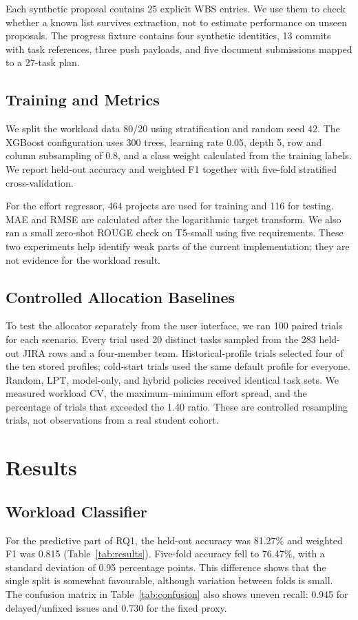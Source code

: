 \documentclass[conference]{IEEEtran}
\begin{document}
Each synthetic proposal contains 25 explicit WBS entries. We use them to check whether a known list survives extraction, not to estimate performance on unseen proposals. The progress fixture contains four synthetic identities, 13 commits with task references, three push payloads, and five document submissions mapped to a 27-task plan.

\subsection{Training and Metrics}
We split the workload data 80/20 using stratification and random seed 42. The XGBoost configuration uses 300 trees, learning rate 0.05, depth 5, row and column subsampling of 0.8, and a class weight calculated from the training labels. We report held-out accuracy and weighted F1 together with five-fold stratified cross-validation.

For the effort regressor, 464 projects are used for training and 116 for testing. MAE and RMSE are calculated after the logarithmic target transform. We also ran a small zero-shot ROUGE check on T5-small using five requirements. These two experiments help identify weak parts of the current implementation; they are not evidence for the workload result.

\subsection{Controlled Allocation Baselines}
To test the allocator separately from the user interface, we ran 100 paired trials for each scenario. Every trial used 20 distinct tasks sampled from the 283 held-out JIRA rows and a four-member team. Historical-profile trials selected four of the ten stored profiles; cold-start trials used the same default profile for everyone. Random, LPT, model-only, and hybrid policies received identical task sets. We measured workload CV, the maximum--minimum effort spread, and the percentage of trials that exceeded the 1.40 ratio. These are controlled resampling trials, not observations from a real student cohort.

\section{Results}

\subsection{Workload Classifier}
For the predictive part of RQ1, the held-out accuracy was 81.27\% and weighted F1 was 0.815 (Table~\ref{tab:results}). Five-fold accuracy fell to 76.47\%, with a standard deviation of 0.95 percentage points. This difference shows that the single split is somewhat favourable, although variation between folds is small. The confusion matrix in Table~\ref{tab:confusion} also shows uneven recall: 0.945 for delayed/unfixed issues and 0.730 for the fixed proxy.
\end{document}
